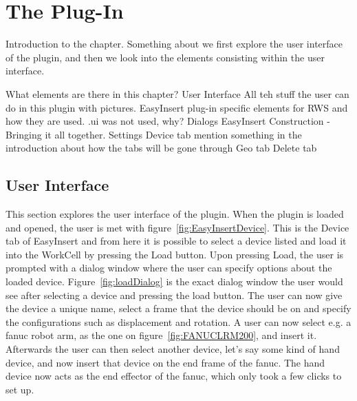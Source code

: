 \section{The Plug-In}
Introduction to the chapter.
Something about we first explore the user interface of the plugin, and then we look into the elements consisting within the user interface.

	What elements are there in this chapter?	
		User Interface
			All teh stuff the user can do in this plugin with pictures.	
		EasyInsert
			plug-in specific elements for RWS and how they are used.
			.ui was not used, why?
		Dialogs
		EasyInsert Construction - Bringing it all together.	
		Settings			
		Device tab
			mention something in the introduction about how the tabs will be gone through
		Geo tab
		Delete tab
		

\subsection{User Interface}
\label{sec:UserInterface}
This section explores the user interface of the plugin. When the plugin is loaded and opened, the user is met with figure~\ref{fig:EasyInsertDevice}. This is the Device tab of EasyInsert and from here it is possible to select a device listed and load it into the WorkCell by pressing the Load button. Upon pressing Load, the user is prompted with a dialog window where the user can specify options about the loaded device. Figure~\ref{fig:loadDialog} is the exact dialog window the user would see after selecting a device and pressing the load button. The user can now give the device a unique name, select a frame that the device should be on and specify the configurations such as displacement and rotation. A user can now select e.g. a fanuc robot arm, as the one on figure~\ref{fig:FANUCLRM200}, and insert it. Afterwards the user can then select another device, let's say some kind of hand device, and now insert that device on the end frame of the fanuc. The hand device now acts as the end effector of the fanuc, which only took a few clicks to set up. 


